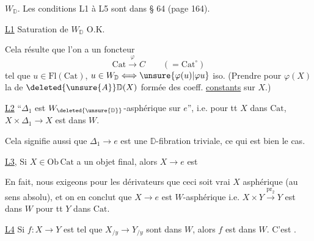 
$W_{\mathbb D}$. Les conditions L1 à L5 sont 
dans  § 64 (page 164).

\uline{L1} Saturation de $W_{\mathbb D}$ O.K.

 Cela résulte   que l'on  a
un foncteur
\[
\mathrm{Cat}\xrightarrow{\varphi} C\qquad (=\mathrm{Cat}^{\circ})
\]
tel que  $u\in\mathrm{Fl}(\mathrm{Cat})$, $u\in W_{\mathbb D}\Longleftrightarrow\unsure{\varphi(u)|\varphi u}$ iso.
(Prendre pour $\varphi(X)$ la  de
$\deleted{\unsure{A}}\mathbb D(X)$ formée des  coeff. \uline{constants} sur $X$.)

\uline{L2} ``$\mathbb{\Delta}_1$ est $W_{\deleted{\unsure{\mathbb D}}}$-asphérique sur $e$'', i.e. pour tt
$X$ dans $\mathrm{Cat}$, $X\times\mathbb{\Delta}_1\longrightarrow X$ est dans $W$.

Cela signifie aussi que $\mathbb{\Delta}_1\longrightarrow e$ est une $\mathbb D$-fibration
triviale, ce qui est bien le cas.

\uline{L3},  Si $X\in\mathrm{Ob}\,\mathrm{Cat}$ a un
objet final, alors $X\longrightarrow e$ est  

 En fait, nous exigeons pour les dérivateurs
que ceci soit vrai  $X$ asphérique
(au sens absolu),  et on en
conclut  que $X\longrightarrow e$ est $W$-asphérique
i.e. $X\times Y\xrightarrow{\mathrm{pr}_2}Y$ est dans $W$ pour tt $Y$
dans $\mathrm{Cat}$.

\uline{L4} Si $f:X\longrightarrow Y$ est tel que $X_{/y}\longrightarrow Y_{/y}$
sont dans $W$, alors $f$ est dans $W$.
C'est .

